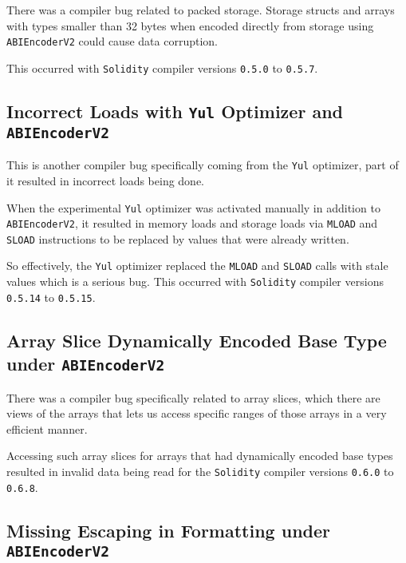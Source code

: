 There was a compiler bug related to packed storage. Storage structs and
arrays with types smaller than 32 bytes when encoded directly from
storage using \texttt{ABIEncoderV2} could cause data corruption.

This occurred with \texttt{Solidity} compiler versions \texttt{0.5.0} to
\texttt{0.5.7}.

\subsection{\texorpdfstring{Incorrect Loads with \texttt{Yul} Optimizer
and
\texttt{ABIEncoderV2}}{Incorrect Loads with Yul Optimizer and ABIEncoderV2}}\label{incorrect-loads-with-yul-optimizer-and-abiencoderv2}

This is another compiler bug specifically coming from the \texttt{Yul}
optimizer, part of it resulted in incorrect loads being done.

When the experimental \texttt{Yul} optimizer was activated manually in
addition to \texttt{ABIEncoderV2}, it resulted in memory loads and
storage loads via \texttt{MLOAD} and \texttt{SLOAD} instructions to be
replaced by values that were already written.

So effectively, the \texttt{Yul} optimizer replaced the \texttt{MLOAD}
and \texttt{SLOAD} calls with stale values which is a serious bug. This
occurred with \texttt{Solidity} compiler versions \texttt{0.5.14} to
\texttt{0.5.15}.

\subsection{\texorpdfstring{Array Slice Dynamically Encoded Base Type
under
\texttt{ABIEncoderV2}}{Array Slice Dynamically Encoded Base Type under ABIEncoderV2}}\label{array-slice-dynamically-encoded-base-type-under-abiencoderv2}

There was a compiler bug specifically related to array slices, which
there are views of the arrays that lets us access specific ranges of
those arrays in a very efficient manner.

Accessing such array slices for arrays that had dynamically encoded base
types resulted in invalid data being read for the \texttt{Solidity}
compiler versions \texttt{0.6.0} to \texttt{0.6.8}.

\subsection{\texorpdfstring{Missing Escaping in Formatting under
\texttt{ABIEncoderV2}}{Missing Escaping in Formatting under ABIEncoderV2}}\label{missing-escaping-in-formatting-under-abiencoderv2}

